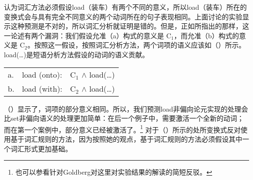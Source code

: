\begin{exe}
\begin{xlist}[iv.]
\begin{exe}
\begin{xlist}[iv.]
\citet[]{Goldberg95a}认为词汇方法必须假设load（装车）有两个不同的意义，所以load（装车）所在的变换式会与具有完全不同意义的两个动词所在的句子表现相同。上面讨论的实验显示这种预测是不对的，所以词汇分析就证明是错的。但是，正如所指出的那样，这一论述有两个漏洞：我们假设允准（a）构式的意义是 C$_1$，而允准（b）构式的意义是 C$_2$。按照这一假设，按照词汇分析方法，两个词项的语义应该如（）所示。load(\ldots)是短语分析方法假设的动词的语义贡献。
\ea
\begin{tabular}[t]{@{}l@{~}l@{~}l@{}}
a. & load (onto): & C$_1$ $\wedge$ load(\ldots)\\
b. & load (with): & C$_2$ $\wedge$ load(\ldots)\\
\end{tabular}
\z
（）显示了，词项的部分意义相同。所以，我们预测load非偏向论元实现的处理会比set非偏向语义的处理更加简单：在后一个例子中，需要激活一个全新的动词；而在第一个案例中，部分意义已经被激活了。\footnote{%
   也可以参看针对Goldberg对这里对实验结果的解读的简短反驳。%
}
\citet[]{Goldberg95a}对于（）所示的处所变换式反对使用基于词汇规则的方法，因为按照她的观点，基于词汇规则的方法必须假设其中一个词汇形式更加基础。

\end{xlist}
\end{exe}
\end{xlist}
\end{exe}
